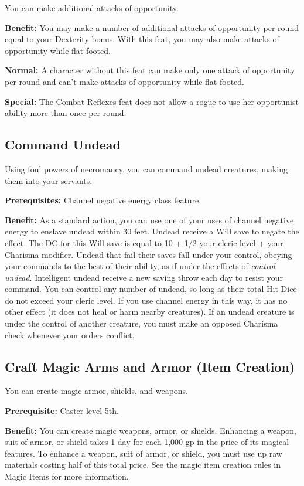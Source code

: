 				
You can make additional attacks of opportunity.
				
\textbf{Benefit:} You may make a number of additional attacks of opportunity per round equal to your Dexterity bonus. With this feat, you may also make attacks of opportunity while flat-footed.
				
\textbf{Normal:} A character without this feat can make only one attack of opportunity per round and can't make attacks of opportunity while flat-footed.
				
\textbf{Special:} The Combat Reflexes feat does not allow a rogue to use her opportunist ability more than once per round.
				
\subsection{Command Undead}

				
Using foul powers of necromancy, you can command undead creatures, making them into your servants.
				
\textbf{Prerequisites:} Channel negative energy class feature.
				
\textbf{Benefit:} As a standard action, you can use one of your uses of channel negative energy to enslave undead within 30 feet. Undead receive a Will save to negate the effect. The DC for this Will save is equal to 10 + 1/2 your cleric level + your Charisma modifier. Undead that fail their saves fall under your control, obeying your commands to the best of their ability, as if under the effects of \textit{control undead}. Intelligent undead receive a new saving throw each day to resist your command. You can control any number of undead, so long as their total Hit Dice do not exceed your cleric level. If you use channel energy in this way, it has no other effect (it does not heal or harm nearby creatures). If an undead creature is under the control of another creature, you must make an opposed Charisma check whenever your orders conflict.
				
\subsection{Craft Magic Arms and Armor (Item Creation)}

				
You can create magic armor, shields, and weapons.
				
\textbf{Prerequisite:} Caster level 5th.
				
\textbf{Benefit:} You can create magic weapons, armor, or shields. Enhancing a weapon, suit of armor, or shield takes 1 day for each 1,000 gp in the price of its magical features. To enhance a weapon, suit of armor, or shield, you must use up raw materials costing half of this total price. See the magic item creation rules in Magic Items for more information.


